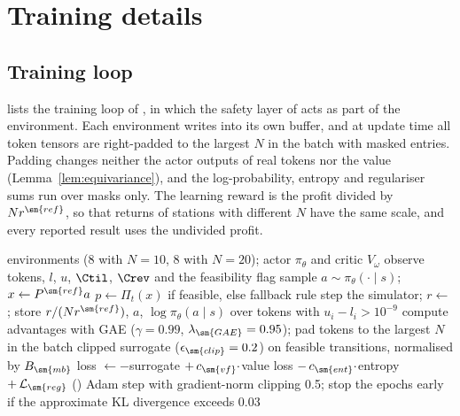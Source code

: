 \section{Training details}\label{sec:training-supp}

\subsection{Training loop}\label{app:ppo}

 lists the training loop of \method{}, in which the safety layer of  acts as part of the environment.
Each environment writes into its own buffer, and at update time all token tensors are right-padded to the largest $N$ in the batch with masked entries.
Padding changes neither the actor outputs of real tokens nor the value (Lemma~\ref{lem:equivariance}), and the log-probability, entropy and regulariser sums run over masks only.
The learning reward is the profit divided by $N r^{\sm{ref}}$, so that returns of stations with different $N$ have the same scale, and every reported result uses the undivided profit.

\begin{algorithm}[t]
\caption{PPO training of \method{} with a variable number of chargers}\label{alg:ppo}
\begin{algorithmic}[1]
 environments (8 with $N=10$, 8 with $N=20$); actor $\pi_\theta$ and critic $V_\omega$
    \State observe tokens, $l$, $u$, $\Ctil$, $\Crev$ and the feasibility flag
    \State sample $a\sim\pi_\theta(\cdot\mid s)$; $x\gets P^{\sm{ref}}a$
    \State $p\gets\Pi_t(x)$ if feasible, else fallback rule 
    \State step the simulator; $r\gets$ ; store $r/(N r^{\sm{ref}})$, $a$, $\log\pi_\theta(a\mid s)$ over tokens with $u_i-l_i>10^{-9}$
  \EndFor
  \State compute advantages with GAE ($\gamma=0.99$, $\lambda_{\sm{GAE}}=0.95$); pad tokens to the largest $N$ in the batch
    \State clipped surrogate ($\epsilon_{\sm{clip}}=0.2$) on feasible transitions, normalised by $B_{\sm{mb}}$
    \State loss $\gets-$surrogate $+\,c_{\sm{vf}}\cdot$value loss $-\,c_{\sm{ent}}\cdot$entropy $+\,\mathcal L_{\sm{reg}}$ ()
    \State Adam step with gradient-norm clipping 0.5; stop the epochs early if the approximate KL divergence exceeds 0.03
  \EndFor
\EndWhile
\end{algorithmic}
\end{algorithm}

